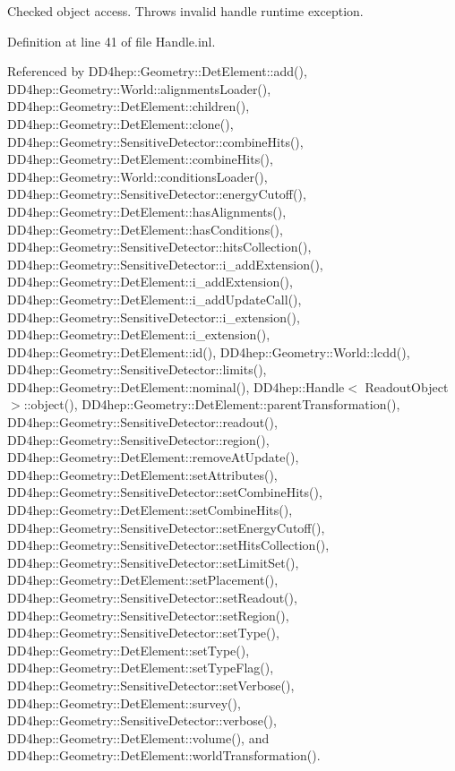 Checked object access. Throws invalid handle runtime exception. 



Definition at line 41 of file Handle.\+inl.



Referenced by D\+D4hep\+::\+Geometry\+::\+Det\+Element\+::add(), D\+D4hep\+::\+Geometry\+::\+World\+::alignments\+Loader(), D\+D4hep\+::\+Geometry\+::\+Det\+Element\+::children(), D\+D4hep\+::\+Geometry\+::\+Det\+Element\+::clone(), D\+D4hep\+::\+Geometry\+::\+Sensitive\+Detector\+::combine\+Hits(), D\+D4hep\+::\+Geometry\+::\+Det\+Element\+::combine\+Hits(), D\+D4hep\+::\+Geometry\+::\+World\+::conditions\+Loader(), D\+D4hep\+::\+Geometry\+::\+Sensitive\+Detector\+::energy\+Cutoff(), D\+D4hep\+::\+Geometry\+::\+Det\+Element\+::has\+Alignments(), D\+D4hep\+::\+Geometry\+::\+Det\+Element\+::has\+Conditions(), D\+D4hep\+::\+Geometry\+::\+Sensitive\+Detector\+::hits\+Collection(), D\+D4hep\+::\+Geometry\+::\+Sensitive\+Detector\+::i\+\_\+add\+Extension(), D\+D4hep\+::\+Geometry\+::\+Det\+Element\+::i\+\_\+add\+Extension(), D\+D4hep\+::\+Geometry\+::\+Det\+Element\+::i\+\_\+add\+Update\+Call(), D\+D4hep\+::\+Geometry\+::\+Sensitive\+Detector\+::i\+\_\+extension(), D\+D4hep\+::\+Geometry\+::\+Det\+Element\+::i\+\_\+extension(), D\+D4hep\+::\+Geometry\+::\+Det\+Element\+::id(), D\+D4hep\+::\+Geometry\+::\+World\+::lcdd(), D\+D4hep\+::\+Geometry\+::\+Sensitive\+Detector\+::limits(), D\+D4hep\+::\+Geometry\+::\+Det\+Element\+::nominal(), D\+D4hep\+::\+Handle$<$ Readout\+Object $>$\+::object(), D\+D4hep\+::\+Geometry\+::\+Det\+Element\+::parent\+Transformation(), D\+D4hep\+::\+Geometry\+::\+Sensitive\+Detector\+::readout(), D\+D4hep\+::\+Geometry\+::\+Sensitive\+Detector\+::region(), D\+D4hep\+::\+Geometry\+::\+Det\+Element\+::remove\+At\+Update(), D\+D4hep\+::\+Geometry\+::\+Det\+Element\+::set\+Attributes(), D\+D4hep\+::\+Geometry\+::\+Sensitive\+Detector\+::set\+Combine\+Hits(), D\+D4hep\+::\+Geometry\+::\+Det\+Element\+::set\+Combine\+Hits(), D\+D4hep\+::\+Geometry\+::\+Sensitive\+Detector\+::set\+Energy\+Cutoff(), D\+D4hep\+::\+Geometry\+::\+Sensitive\+Detector\+::set\+Hits\+Collection(), D\+D4hep\+::\+Geometry\+::\+Sensitive\+Detector\+::set\+Limit\+Set(), D\+D4hep\+::\+Geometry\+::\+Det\+Element\+::set\+Placement(), D\+D4hep\+::\+Geometry\+::\+Sensitive\+Detector\+::set\+Readout(), D\+D4hep\+::\+Geometry\+::\+Sensitive\+Detector\+::set\+Region(), D\+D4hep\+::\+Geometry\+::\+Sensitive\+Detector\+::set\+Type(), D\+D4hep\+::\+Geometry\+::\+Det\+Element\+::set\+Type(), D\+D4hep\+::\+Geometry\+::\+Det\+Element\+::set\+Type\+Flag(), D\+D4hep\+::\+Geometry\+::\+Sensitive\+Detector\+::set\+Verbose(), D\+D4hep\+::\+Geometry\+::\+Det\+Element\+::survey(), D\+D4hep\+::\+Geometry\+::\+Sensitive\+Detector\+::verbose(), D\+D4hep\+::\+Geometry\+::\+Det\+Element\+::volume(), and D\+D4hep\+::\+Geometry\+::\+Det\+Element\+::world\+Transformation().

